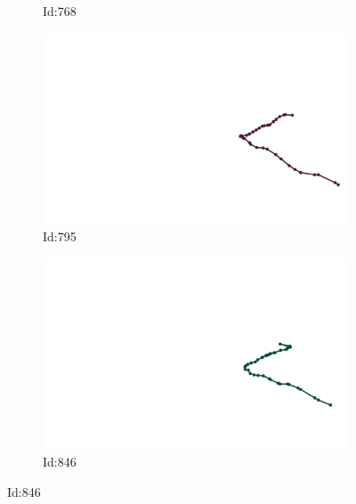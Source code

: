 \documentclass[12pt,twoside]{report}
\begin{document}
\begin{figure}
\begin{subfigure}[b]{0.20\textwidth}
\caption{Id:768}
\end{subfigure}
\begin{subfigure}[b]{0.20\textwidth}
\centering
\includegraphics[width=\textwidth]{../trajectories/795.png}
\caption{Id:795}
\end{subfigure}
\begin{subfigure}[b]{0.20\textwidth}
\centering
\includegraphics[width=\textwidth]{../trajectories/846.png}
\caption{Id:846}
\end{subfigure}
\end{figure}
\end{document}
